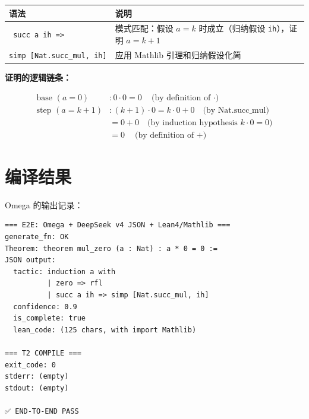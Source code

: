 \documentclass[
  11pt,
  a4paper,
]{ctexrep}
\newcounter{none} %
\begin{document}
{\def\LTcaptype{none} %
\begin{longtable}[]{@{}
  >{\raggedright\arraybackslash}p{}
  >{\raggedright\arraybackslash}p{}@{}}
\toprule\noalign{}
\begin{minipage}[b]{\linewidth}\raggedright
语法
\end{minipage} & \begin{minipage}[b]{\linewidth}\raggedright
说明
\end{minipage} \\
\midrule\noalign{}
\endhead
\bottomrule\noalign{}
\endlastfoot
\texttt{\textbar{}\ succ\ a\ ih\ =\textgreater{}} & 模式匹配：假设
\(a=k\) 时成立（归纳假设 \texttt{ih}），证明 \(a=k+1\) \\
\texttt{simp\ {[}Nat.succ\_mul,\ ih{]}} & 应用 Mathlib
引理和归纳假设化简 \\
\end{longtable}
}

\textbf{证明的逻辑链条：}

\[
\begin{aligned}
\text{base }(a=0)&: 0\cdot 0 = 0 \quad \text{(by definition of $\cdot$)} \\
\text{step }(a=k+1)&: (k+1)\cdot 0 = k\cdot 0 + 0 \quad \text{(by Nat.succ\_mul)} \\
&= 0 + 0 \quad \text{(by induction hypothesis $k\cdot 0 = 0$)} \\
&= 0 \quad \text{(by definition of $+$)}
\end{aligned}
\]

\section{编译结果}\label{sec-compile-result}

Omega 的输出记录：

\begin{verbatim}
=== E2E: Omega + DeepSeek v4 JSON + Lean4/Mathlib ===
generate_fn: OK
Theorem: theorem mul_zero (a : Nat) : a * 0 = 0 :=
JSON output:
  tactic: induction a with
          | zero => rfl
          | succ a ih => simp [Nat.succ_mul, ih]
  confidence: 0.9
  is_complete: true
  lean_code: (125 chars, with import Mathlib)

=== T2 COMPILE ===
exit_code: 0
stderr: (empty)
stdout: (empty)

✅ END-TO-END PASS
\end{verbatim}
\end{document}
